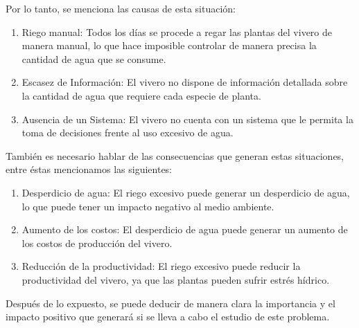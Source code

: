 \bigbreak
Por lo tanto, se menciona las causas de esta situación:
\begin{enumerate}
      \item Riego manual: Todos los días se procede a regar las plantas del vivero de
            manera manual, lo que hace imposible controlar de manera precisa la cantidad de
            agua que se consume.
      \item Escasez de Información: El vivero no dispone de información detallada sobre la
            cantidad de agua que requiere cada especie de planta.
      \item Ausencia de un Sistema: El vivero no cuenta con un sistema que le permita la
            toma de decisiones frente al uso excesivo de agua.
\end{enumerate}
También es necesario hablar de las consecuencias que generan estas situaciones,
entre éstas mencionamos las siguientes:
\begin{enumerate}
      \item Desperdicio de agua: El riego excesivo puede generar un desperdicio de agua, lo
            que puede tener un impacto negativo al medio ambiente.
      \item Aumento de los costos: El desperdicio de agua puede generar un aumento de los
            costos de producción del vivero.
      \item Reducción de la productividad: El riego excesivo puede reducir la productividad
            del vivero, ya que las plantas pueden sufrir estrés hídrico.
\end{enumerate}
Después de lo expuesto, se puede deducir de manera clara la importancia y el impacto positivo que
generará si se lleva a cabo el estudio de este problema.